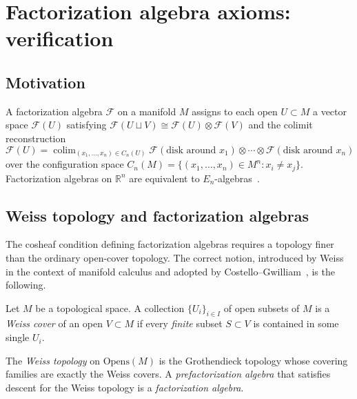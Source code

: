 \section{Factorization algebra axioms: verification}
\label{sec:factorization-axioms-complete}

\subsection{Motivation}

\begin{construction}
A factorization algebra $\mathcal{F}$ on a manifold $M$ assigns to each open $U \subset M$ a vector space $\mathcal{F}(U)$ satisfying
$\mathcal{F}(U \sqcup V) \cong \mathcal{F}(U) \otimes \mathcal{F}(V)$
and the colimit reconstruction
\[\mathcal{F}(U)= \operatorname{colim}_{(x_1,\ldots,x_n) \in C_n(U)}
   \mathcal{F}(\text{disk around } x_1) \otimes \cdots \otimes
   \mathcal{F}(\text{disk around } x_n)\]
over the configuration space $C_n(M) = \{(x_1, \ldots, x_n) \in M^n : x_i \neq x_j\}$.
Factorization algebras on $\mathbb{R}^n$ are
equivalent to $E_n$-algebras~\cite[Theorem~5.4.5.9]{HA}.
\end{construction}

\subsection{Weiss topology and factorization algebras}

The cosheaf condition defining factorization algebras requires a topology
finer than the ordinary open-cover topology.  The correct notion,
introduced by Weiss~\cite{Wei99} in the context of manifold calculus and
adopted by Costello--Gwilliam~\cite{CG17}, is the following.

\begin{definition}\label{def:weiss-cover}
Let $M$ be a topological space.  A collection $\{U_i\}_{i \in I}$ of open
subsets of $M$ is a \emph{Weiss cover} of an open $V \subset M$ if every
\emph{finite} subset $S \subset V$ is contained in some single $U_i$.
\end{definition}

The \emph{Weiss topology} on $\mathrm{Opens}(M)$ is the Grothendieck
topology whose covering families are exactly the Weiss covers.
A \emph{prefactorization algebra} that satisfies descent for the Weiss
topology is a \emph{factorization algebra}.

